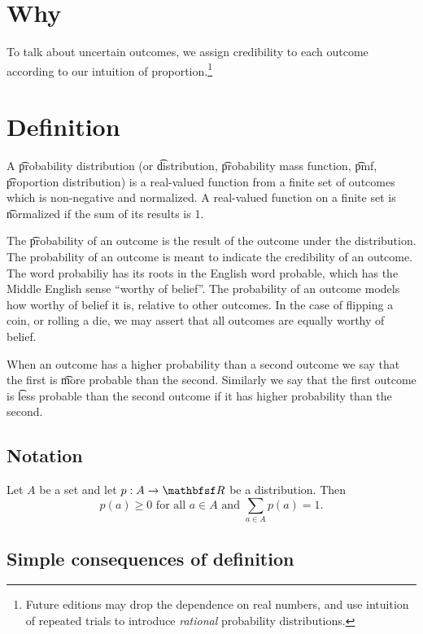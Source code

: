 

\section*{Why}

To talk about uncertain outcomes, we assign credibility to each outcome according to our intuition of proportion.\footnote{Future editions may drop the dependence on real numbers, and use intuition of repeated trials to introduce \textit{rational} probability distributions.}

\section*{Definition}

A \t{probability distribution} (or \t{distribution}, \t{probability mass function}, \t{pmf}, \t{proportion distribution}) is a real-valued function from a finite set of outcomes which is non-negative and normalized.
A real-valued function on a finite set is \t{normalized} if the sum of its results is 1.

The \t{probability of an outcome} is the result of the outcome under the distribution.
The probability of an outcome is meant to indicate the credibility of an outcome.
The word probabiliy has its roots in the English word probable, which has the Middle English sense ``worthy of belief''.
The probability of an outcome models how worthy of belief it is, relative to other outcomes.
In the case of flipping a coin, or rolling a die, we may assert that all outcomes are equally worthy of belief.

When an outcome has a higher probability than a second outcome we say that the first is \t{more probable} than the second.
Similarly we say that the first outcome is \t{less probable} than the second outcome if it has higher probability than the second.

\subsection*{Notation}

Let $A$ be a set and let $p: A \to \R $ be a distribution.
Then
\[
\textstyle
p(a) \geq 0 \text{ for all } a \in A \text{ and } \sum_{a \in A} p(a) = 1.
\]

\subsection*{Simple consequences of definition}

